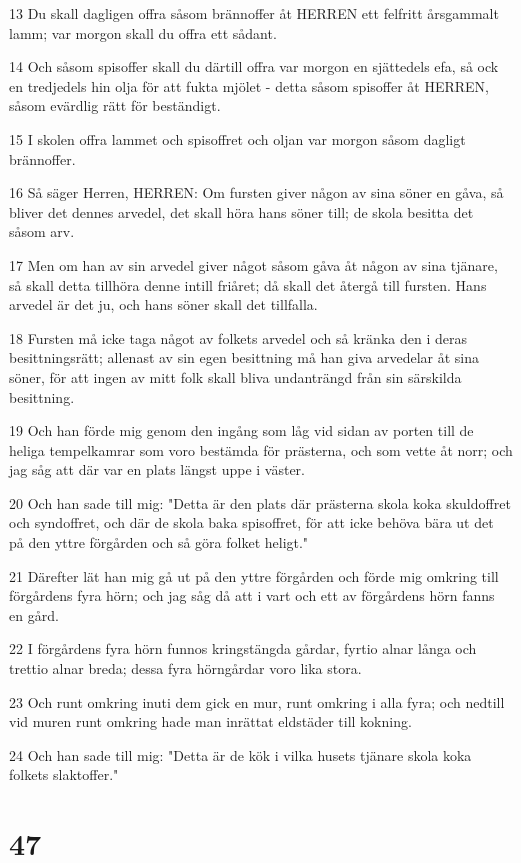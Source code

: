 \par 13 Du skall dagligen offra såsom brännoffer åt HERREN ett felfritt årsgammalt lamm; var morgon skall du offra ett sådant.
\par 14 Och såsom spisoffer skall du därtill offra var morgon en sjättedels efa, så ock en tredjedels hin olja för att fukta mjölet - detta såsom spisoffer åt HERREN, såsom evärdlig rätt för beständigt.
\par 15 I skolen offra lammet och spisoffret och oljan var morgon såsom dagligt brännoffer.
\par 16 Så säger Herren, HERREN: Om fursten giver någon av sina söner en gåva, så bliver det dennes arvedel, det skall höra hans söner till; de skola besitta det såsom arv.
\par 17 Men om han av sin arvedel giver något såsom gåva åt någon av sina tjänare, så skall detta tillhöra denne intill friåret; då skall det återgå till fursten. Hans arvedel är det ju, och hans söner skall det tillfalla.
\par 18 Fursten må icke taga något av folkets arvedel och så kränka den i deras besittningsrätt; allenast av sin egen besittning må han giva arvedelar åt sina söner, för att ingen av mitt folk skall bliva undanträngd från sin särskilda besittning.
\par 19 Och han förde mig genom den ingång som låg vid sidan av porten till de heliga tempelkamrar som voro bestämda för prästerna, och som vette åt norr; och jag såg att där var en plats längst uppe i väster.
\par 20 Och han sade till mig: "Detta är den plats där prästerna skola koka skuldoffret och syndoffret, och där de skola baka spisoffret, för att icke behöva bära ut det på den yttre förgården och så göra folket heligt."
\par 21 Därefter lät han mig gå ut på den yttre förgården och förde mig omkring till förgårdens fyra hörn; och jag såg då att i vart och ett av förgårdens hörn fanns en gård.
\par 22 I förgårdens fyra hörn funnos kringstängda gårdar, fyrtio alnar långa och trettio alnar breda; dessa fyra hörngårdar voro lika stora.
\par 23 Och runt omkring inuti dem gick en mur, runt omkring i alla fyra; och nedtill vid muren runt omkring hade man inrättat eldstäder till kokning.
\par 24 Och han sade till mig: "Detta är de kök i vilka husets tjänare skola koka folkets slaktoffer."

\chapter{47}

